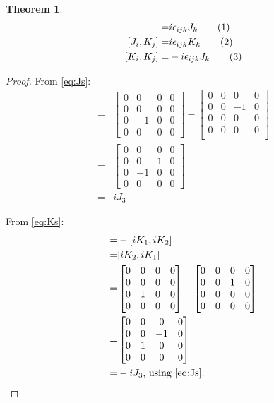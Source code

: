 \documentclass[]{article}
\newcommand\numberthis{\addtocounter{equation}{1}\tag{\theequation}}
\newtheorem{thm}{Theorem}
\begin{document}
\begin{thm}
	\begin{align*}
		[J_i,J_j] =& i \epsilon_{ijk} J_k \numberthis \label{eq:J:J}\\
		[J_i,K_j] =& i \epsilon_{ijk} K_k \numberthis \label{eq:J:K}\\
		[K_i,K_j] =& - i \epsilon_{ijk} J_k \numberthis \label{eq:K:K}
	\end{align*}
\end{thm}
\begin{proof}
	From \eqref{eq:Js}:
	\begin{align*}
		[J_1, J_2] =& \begin{bmatrix}
			0&0&0&0\\
			0&0&0&0\\
			0&-1&0&0\\
			0&0&0&0
		\end{bmatrix} - \begin{bmatrix}
			0&0&0&0\\
			0&0&-1&0\\
			0&0&0&0\\
			0&0&0&0\\
		\end{bmatrix}\\
		=& \begin{bmatrix}
			0&0&0&0\\
			0&0&1&0\\
			0&-1&0&0\\
			0&0&0&0
		\end{bmatrix}\\
		=&i J_3
	\end{align*}
	
	From \eqref{eq:Ks}:
	\begin{align*}
		[K_1,K_2] =& -[i K_1, i K_2] \\
		=& [i K_2,i K_1] \\
		=& \begin{bmatrix}
			0&0&0&0\\
			0&0&0&0\\
			0&1&0&0\\
			0&0&0&0\\
		\end{bmatrix} -  \begin{bmatrix}
			0&0&0&0\\
			0&0&1&0\\
			0&0&0&0\\
			0&0&0&0\\
		\end{bmatrix}\\
		=&\begin{bmatrix}
			0&0&0&0\\
			0&0&-1&0\\
			0&1&0&0\\
			0&0&0&0\\
		\end{bmatrix}\\
		=& -i J_3 \text{, using \eqref{eq:Js}.}
	\end{align*}
\end{proof}
\end{document}
